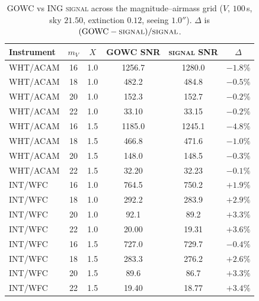 \documentclass[11pt]{article}
\begin{document}
\begin{table}[!htbp]
\centering
\small
\begin{tabular}{lccccc}
\hline
Instrument & $m_V$ & $X$ & GOWC SNR & \textsc{signal} SNR & $\Delta$ \\
\hline
WHT/ACAM & 16 & 1.0 & 1256.7 & 1280.0 & $-1.8\%$ \\
WHT/ACAM & 18 & 1.0 & 482.2 & 484.8 & $-0.5\%$ \\
WHT/ACAM & 20 & 1.0 & 152.3 & 152.7 & $-0.2\%$ \\
WHT/ACAM & 22 & 1.0 & 33.10 & 33.15 & $-0.2\%$ \\
WHT/ACAM & 16 & 1.5 & 1185.0 & 1245.1 & $-4.8\%$ \\
WHT/ACAM & 18 & 1.5 & 466.8 & 471.6 & $-1.0\%$ \\
WHT/ACAM & 20 & 1.5 & 148.0 & 148.5 & $-0.3\%$ \\
WHT/ACAM & 22 & 1.5 & 32.20 & 32.23 & $-0.1\%$ \\
INT/WFC & 16 & 1.0 & 764.5 & 750.2 & $+1.9\%$ \\
INT/WFC & 18 & 1.0 & 292.2 & 283.9 & $+2.9\%$ \\
INT/WFC & 20 & 1.0 & 92.1 & 89.2 & $+3.3\%$ \\
INT/WFC & 22 & 1.0 & 20.00 & 19.31 & $+3.6\%$ \\
INT/WFC & 16 & 1.5 & 727.0 & 729.7 & $-0.4\%$ \\
INT/WFC & 18 & 1.5 & 283.3 & 276.2 & $+2.6\%$ \\
INT/WFC & 20 & 1.5 & 89.6 & 86.7 & $+3.3\%$ \\
INT/WFC & 22 & 1.5 & 19.40 & 18.77 & $+3.4\%$ \\
\hline
\end{tabular}
\caption{GOWC vs ING \textsc{signal} across the magnitude--airmass grid ($V$,
$100$\,s, sky $21.50$, extinction $0.12$, seeing $1.0''$). $\Delta$ is
$(\mathrm{GOWC}-\textsc{signal})/\textsc{signal}$.}
\label{tab:snrgrid}
\end{table}
\end{document}
